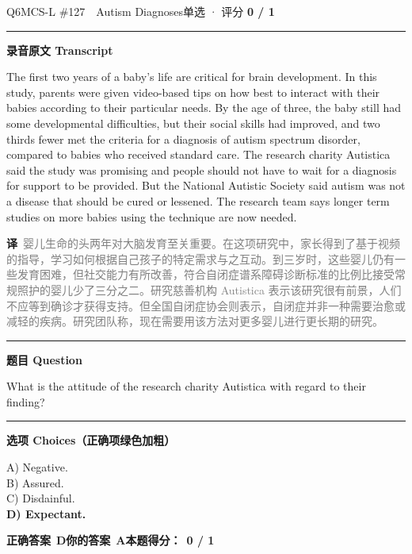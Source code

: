 \documentclass[11pt]{article}
\newcommand{\ptesub}[1]{%
  \par\needspace{2\baselineskip}\smallskip
  {\color{cAccent}\rule[-0.2ex]{3pt}{1.05em}}\hspace{6pt}%
  {\bfseries\color{cHead}#1}\par\nopagebreak\smallskip}
\newcommand{\zh}[1]{{\footnotesize\textcolor{cNote}{\textbf{译}}\ \textcolor{gray}{#1}}}
\begin{document}
\begin{qblock}{Q6\quad MCS-L \#127\ \ Autism Diagnoses}{单选 · 评分 \textcolor{cAccent}{\bfseries 0 / 1}}
\ptesub{录音原文 Transcript}
\begin{promptbox}
The first two years of a baby's life are critical for brain development. In this study, parents were given video-based tips on how best to interact with their babies according to their particular needs. By the age of three, the baby still had some developmental difficulties, but their social skills had improved, and two thirds fewer met the criteria for a diagnosis of autism spectrum disorder, compared to babies who received standard care. The research charity Autistica said the study was promising and people should not have to wait for a diagnosis for support to be provided. But the National Autistic Society said autism was not a disease that should be cured or lessened. The research team says longer term studies on more babies using the technique are now needed.
\end{promptbox}
\zh{婴儿生命的头两年对大脑发育至关重要。在这项研究中，家长得到了基于视频的指导，学习如何根据自己孩子的特定需求与之互动。到三岁时，这些婴儿仍有一些发育困难，但社交能力有所改善，符合自闭症谱系障碍诊断标准的比例比接受常规照护的婴儿少了三分之二。研究慈善机构 Autistica 表示该研究很有前景，人们不应等到确诊才获得支持。但全国自闭症协会则表示，自闭症并非一种需要治愈或减轻的疾病。研究团队称，现在需要用该方法对更多婴儿进行更长期的研究。}
\ptesub{题目 Question}
\begin{notebox}What is the attitude of the research charity Autistica with regard to their finding?\end{notebox}
\ptesub{选项 Choices（正确项绿色加粗）}
{\small
A) Negative.\\
B) Assured.\\
C) Disdainful.\\
{\color{cFix}\textbf{D) Expectant.}}}
\par\smallskip
\textbf{正确答案}\ \textcolor{cFix}{\bfseries D}\qquad\textbf{你的答案}\ {\color{cWrong}\bfseries A}\qquad\textbf{本题得分：}\ {\color{cAccent}\bfseries 0 / 1}
\end{qblock}
\end{document}
